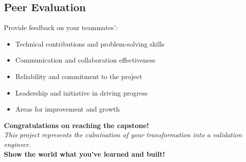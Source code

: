 \documentclass[11pt,a4paper]{article}
\begin{document}
\subsection{Peer Evaluation}
Provide feedback on your teammates':
\begin{itemize}
    \item Technical contributions and problem-solving skills
    \item Communication and collaboration effectiveness
    \item Reliability and commitment to the project
    \item Leadership and initiative in driving progress
    \item Areas for improvement and growth
\end{itemize}

\vspace{1cm}

\begin{center}
\textbf{Congratulations on reaching the capstone!}\\
\textit{This project represents the culmination of your transformation into a validation engineer.}\\
\textbf{Show the world what you've learned and built!}
\end{center}
\end{document}
